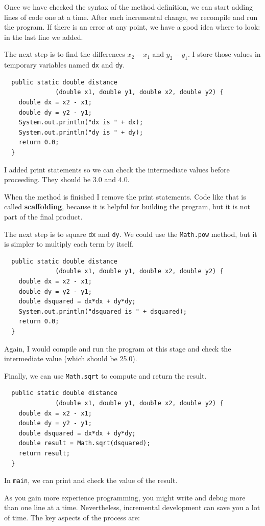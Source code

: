 Once we have checked the syntax of the method definition, we
can start adding lines of code one at a time.  After each
incremental change, we recompile and run the program.  If there is
an error at any point, we have a good idea where to look:
in the last line we added.

The next step is to find the differences
$x_2 - x_1$ and $y_2 - y_1$.  I store those values in
temporary variables named {\tt dx} and {\tt dy}.

\begin{lstlisting}
  public static double distance
              (double x1, double y1, double x2, double y2) {
    double dx = x2 - x1;
    double dy = y2 - y1;
    System.out.println("dx is " + dx);
    System.out.println("dy is " + dy);
    return 0.0;
  }
\end{lstlisting}
%
I added print statements so we can check the intermediate values
before proceeding.  They should be 3.0 and 4.0.


When the method is finished I remove the print statements.  Code
like that is called {\bf scaffolding}, because it is helpful for
building the program, but it is not part of the final product.

The next step is to square {\tt dx} and {\tt dy}.  We could use the
{\tt Math.pow} method, but it is simpler to multiply each term by
itself.

\begin{lstlisting}
  public static double distance
              (double x1, double y1, double x2, double y2) {
    double dx = x2 - x1;
    double dy = y2 - y1;
    double dsquared = dx*dx + dy*dy;
    System.out.println("dsquared is " + dsquared);
    return 0.0;
  }
\end{lstlisting}
%
Again, I would compile and run the program at this stage
and check the intermediate value (which should be 25.0).

Finally, we can use {\tt Math.sqrt} to compute and
return the result.

\begin{lstlisting}
  public static double distance
              (double x1, double y1, double x2, double y2) {
    double dx = x2 - x1;
    double dy = y2 - y1;
    double dsquared = dx*dx + dy*dy;
    double result = Math.sqrt(dsquared);
    return result;
  }
\end{lstlisting}
%
In {\tt main}, we can print and check the value of the result.

As you gain more experience programming, you might
write and debug more than one line at a time.  Nevertheless,
incremental development can save you a lot of time.
%
The key aspects of the process are:


